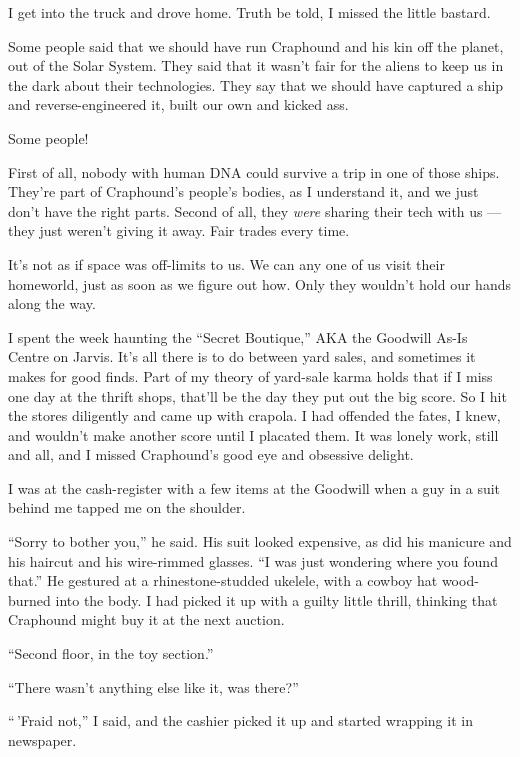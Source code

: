 I get into the truck and drove home. Truth be told, I missed the
little bastard.

\tb

Some people said that we should have run Craphound and his kin off
the planet, out of the Solar System. They said that it wasn't fair
for the aliens to keep us in the dark about their technologies.
They say that we should have captured a ship and reverse-engineered
it, built our own and kicked ass.

Some people!

First of all, nobody with human DNA could survive a trip in one of
those ships. They're part of Craphound's people's bodies, as I
understand it, and we just don't have the right parts. Second of
all, they \emph{were} sharing their tech with us --- they just
weren't giving it away. Fair trades every time.

It's not as if space was off-limits to us. We can any one of us
visit their homeworld, just as soon as we figure out how. Only they
wouldn't hold our hands along the way.

\tb

I spent the week haunting the ``Secret Boutique,'' AKA the Goodwill
As-Is Centre on Jarvis. It's all there is to do between yard sales,
and sometimes it makes for good finds. Part of my theory of
yard-sale karma holds that if I miss one day at the thrift shops,
that'll be the day they put out the big score. So I hit the stores
diligently and came up with crapola. I had offended the fates, I
knew, and wouldn't make another score until I placated them. It was
lonely work, still and all, and I missed Craphound's good eye and
obsessive delight.

I was at the cash-register with a few items at the Goodwill when a
guy in a suit behind me tapped me on the shoulder.

``Sorry to bother you,'' he said. His suit looked expensive, as did
his manicure and his haircut and his wire-rimmed glasses.
``I was just wondering where you found that.'' He gestured at a
rhinestone-studded ukelele, with a cowboy hat wood-burned into the
body. I had picked it up with a guilty little thrill, thinking that
Craphound might buy it at the next auction.

``Second floor, in the toy section.''

``There wasn't anything else like it, was there?''

``\,'Fraid not,'' I said, and the cashier picked it up and started
wrapping it in newspaper.

